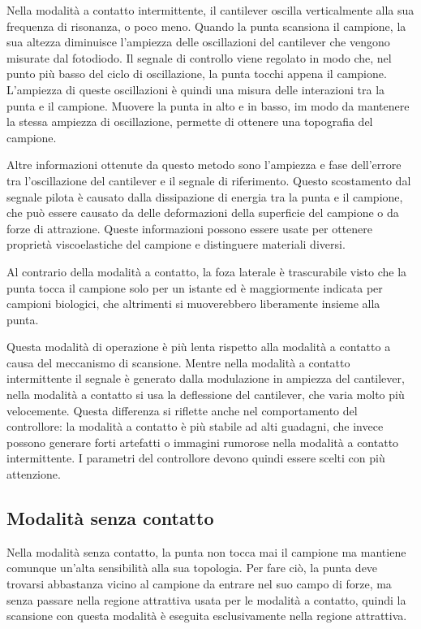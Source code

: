 \documentclass[../main.tex]{subfiles}
\begin{document}
Nella modalità a contatto intermittente, il cantilever oscilla verticalmente alla sua frequenza di risonanza, o poco meno. Quando la punta scansiona il campione, la sua altezza diminuisce l'ampiezza delle oscillazioni del cantilever che vengono misurate dal fotodiodo. Il segnale di controllo viene regolato in modo che, nel punto più basso del ciclo di oscillazione, la punta tocchi appena il campione. L'ampiezza di queste oscillazioni è quindi una misura delle interazioni tra la punta e il campione. Muovere la punta in alto e in basso, im modo da mantenere la stessa ampiezza di oscillazione, permette di ottenere una topografia del campione.

Altre informazioni ottenute da questo metodo sono l'ampiezza e fase dell'errore tra l'oscillazione del cantilever e il segnale di riferimento. Questo scostamento dal segnale pilota è causato dalla dissipazione di energia tra la punta e il campione, che può essere causato da delle deformazioni della superficie del campione o da forze di attrazione. Queste informazioni possono essere usate per ottenere proprietà viscoelastiche del campione e distinguere materiali diversi.\cite{bruker_phase_imaging}

Al contrario della modalità a contatto, la foza laterale è trascurabile visto che la punta tocca il campione solo per un istante ed è maggiormente indicata per campioni biologici, che altrimenti si muoverebbero liberamente insieme alla punta.\cite{karrasch_1993}

Questa modalità di operazione è più lenta rispetto alla modalità a contatto a causa del meccanismo di scansione. Mentre nella modalità a contatto intermittente il segnale è generato dalla modulazione in ampiezza del cantilever, nella modalità a contatto si usa la deflessione del cantilever, che varia molto più velocemente. Questa differenza si riflette anche nel comportamento del controllore: la modalità a contatto è più stabile ad alti guadagni, che invece possono generare forti artefatti o immagini rumorose nella modalità a contatto intermittente. I parametri del controllore devono quindi essere scelti con più attenzione. 

\subsection{Modalità senza contatto}

Nella modalità senza contatto, la punta non tocca mai il campione ma mantiene comunque un'alta sensibilità alla sua topologia. Per fare ciò, la punta deve trovarsi abbastanza vicino al campione da entrare nel suo campo di forze, ma senza passare nella regione attrattiva usata per le modalità a contatto, quindi la scansione con questa modalità è eseguita esclusivamente nella regione attrattiva.
\end{document}

